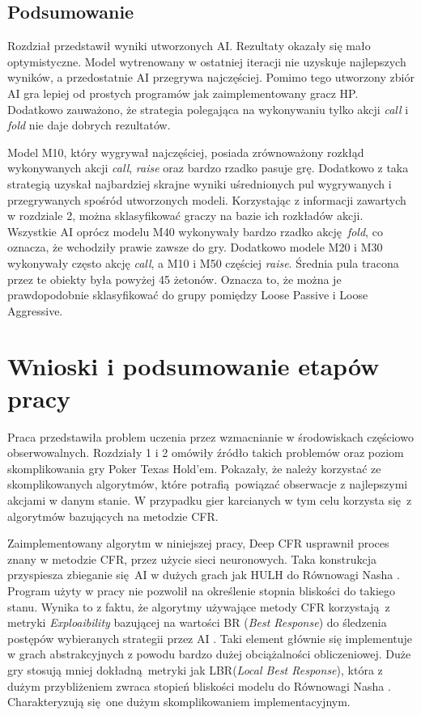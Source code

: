 \documentclass[12pt,oneside,a4paper]{report}
\begin{document}
\newpage
\text{}
\section{Podsumowanie}


Rozdział przedstawił wyniki utworzonych AI. Rezultaty okazały się mało optymistyczne. Model
wytrenowany w ostatniej iteracji nie uzyskuje najlepszych wyników, a przedostatnie AI przegrywa
najczęściej. Pomimo tego utworzony zbiór AI gra lepiej od prostych programów jak zaimplementowany 
gracz HP. Dodatkowo zauważono, że strategia polegająca na wykonywaniu tylko akcji \emph{call} i
\emph{fold} nie daje dobrych rezultatów. 

Model M10, który wygrywał najczęściej, posiada zrównoważony
rozkłąd wykonywanych akcji \emph{call}, \emph{raise} oraz bardzo rzadko pasuje grę. Dodatkowo z
taka strategią uzyskał najbardziej skrajne wyniki uśrednionych pul wygrywanych i przegrywanych
spośród utworzonych modeli. Korzystając z informacji zawartych w rozdziale 2, można
sklasyfikować graczy na bazie ich rozkładów akcji. Wszystkie AI oprócz modelu M40 wykonywały
bardzo rzadko akcję \emph{fold}, co oznacza, że wchodziły prawie zawsze do gry.
Dodatkowo modele M20 i M30 wykonywały często akcję \emph{call}, a M10 i M50 częściej
\emph{raise}. Średnia pula tracona przez te obiekty była powyżej 45 żetonów.
Oznacza to, że można je prawdopodobnie sklasyfikować do 
grupy pomiędzy Loose Passive i Loose Aggressive.


\chapter{Wnioski i podsumowanie etapów pracy}

Praca przedstawiła problem uczenia przez wzmacnianie w środowiskach częściowo obserwowalnych. 
Rozdziały 1 i 2 omówiły źródło takich problemów oraz poziom skomplikowania gry Poker Texas Hold'em.
Pokazały, że należy 
korzystać ze skomplikowanych algorytmów, które potrafią powiązać obserwacje z najlepszymi akcjami w
danym stanie. W przypadku gier karcianych w tym celu korzysta się z algorytmów bazujących na
metodzie CFR. 

Zaimplementowany algorytm w niniejszej pracy, Deep CFR usprawnił proces znany w metodzie CFR,
przez użycie sieci
neuronowych. Taka konstrukcja przyspiesza zbieganie się AI w dużych grach jak HULH
do Równowagi Nasha \cite{DCFR}.
Program użyty w pracy nie pozwolił na określenie stopnia bliskości
do takiego
stanu. Wynika to z faktu, że algorytmy używające metody CFR korzystają z metryki
\emph{Exploaibility} bazującej na wartości BR (\emph{Best Response})  do śledzenia postępów wybieranych
strategii przez AI \cite{lbr}.
Taki element głównie się implementuje w grach
abstrakcyjnych z powodu bardzo dużej obciążalności obliczeniowej. 
Duże gry stosują mniej dokładną metryki jak LBR(\emph{Local Best Response}),
która z dużym przybliżeniem zwraca stopień bliskości
modelu do Równowagi Nasha \cite{lbr}. Charakteryzują się one dużym skomplikowaniem 
implementacyjnym.
\end{document}
